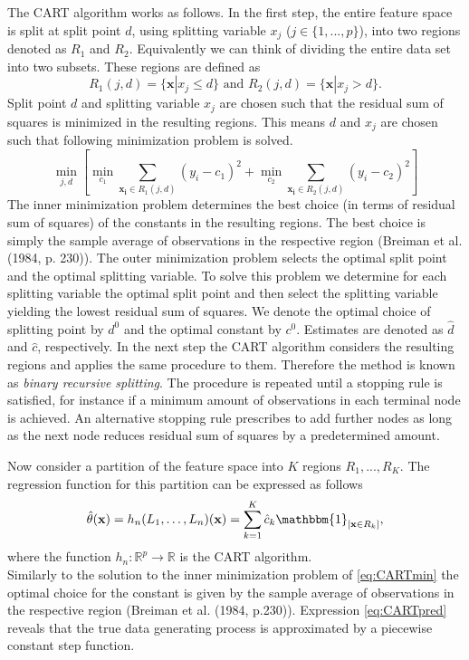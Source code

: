 \noindent
The CART algorithm works as follows. In the first step, the entire feature space is split at split point $d$, using splitting variable $x_j$ ($j \in \{1,...,p\}$), into two regions denoted as $R_1$ and $R_2$. Equivalently we can think of dividing the entire data set into two subsets. These regions are defined as
$$R_1(j,d)=\{\mathbf{x}|x_j \le d\} \text{ and } R_2(j,d)=\{\mathbf{x}|x_j > d\}.$$
\noindent
Split point $d$ and splitting variable $x_j$ are chosen such that the residual sum of squares is minimized in the resulting regions. This means $d$ and $x_j$ are chosen such that following minimization problem is solved.
\begin{equation}
\label{eq:CARTmin}
\min\limits_{j,d}[\min\limits_{c_1}\sum\limits_{\mathbf{x_i} \in R_1(j,d)}(y_i-c_1)^2 + \min\limits_{c_2}\sum\limits_{\mathbf{x_i} \in R_2(j,d)}(y_i-c_2)^2]
\end{equation}
\noindent
The inner minimization problem determines the best choice (in terms of residual sum of squares) of the constants in the resulting regions. The best choice is simply the sample average of observations in the respective region (Breiman et al. (1984, p. 230)). The outer minimization problem selects the optimal split point and the optimal splitting variable. To solve this problem we determine for each splitting variable the optimal split point and then select the splitting variable yielding the lowest residual sum of squares. We denote the optimal choice of splitting point by $d^0$ and the optimal constant by $c^0$. Estimates are denoted as $\hat{d}$ and $\hat{c}$, respectively. In the next step the CART algorithm considers the resulting regions and applies the same procedure to them. Therefore the method is known as \textit{binary recursive splitting}.  The procedure is repeated until a stopping rule is satisfied, for instance if a minimum amount of observations in each terminal node is achieved. An alternative stopping rule prescribes to add further nodes as long as the next node reduces residual sum of squares by a predetermined amount.

Now consider a partition of the feature space into $K$ regions $R_1,...,R_K$. The regression function for this partition can be expressed as follows
\begin{equation}
\label{eq:CARTpred}
\hat{\theta}(\mathbf{x})= h_{n}(L_{1},\dots, L_{n})(\mathbf{x})=\sum\limits_{k=1}^{K}\hat{c}_k\mathbbm{1}_{[\mathbf{x}\in R_k]}, 
\end{equation}
where the function  $h_n:\mathbb{R}^{p} \rightarrow \mathbb{R}$ is the CART algorithm.\\
Similarly to the solution to the inner minimization problem of \eqref{eq:CARTmin} the optimal choice for the constant is given by the sample average of observations in the respective region (Breiman et al. (1984, p.230)). Expression \eqref{eq:CARTpred} reveals that the true data generating process is approximated by a piecewise constant step function.

